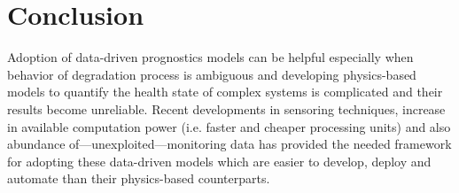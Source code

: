 \section{Conclusion}
Adoption of data-driven prognostics models can be helpful especially when behavior of degradation process is ambiguous and developing physics-based models to quantify the health state of complex systems is complicated and their results become unreliable. Recent developments in sensoring techniques, increase in available computation power (i.e. faster and cheaper processing units) and also abundance of—unexploited—monitoring data has provided the needed framework for adopting these data-driven models which are easier to develop, deploy and automate than their physics-based counterparts.
